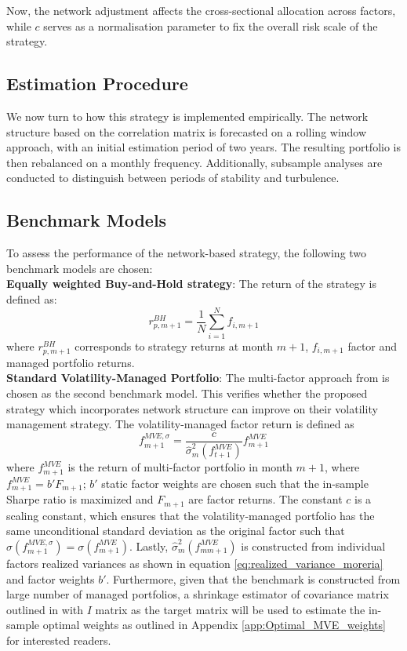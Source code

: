 \documentclass[11pt]{article}
\begin{document}
Now, the network adjustment affects the cross-sectional allocation across factors, while 
$c$ serves as a normalisation parameter to fix the overall risk scale of the strategy.

\subsection{Estimation Procedure}
We now turn to how this strategy is implemented empirically.
The network structure based on the correlation matrix is forecasted on a rolling window approach, with an initial estimation period of two years. The resulting portfolio is then rebalanced on a monthly frequency. Additionally, subsample analyses are conducted to distinguish between periods of stability and turbulence.

\subsection{Benchmark Models}
\label{sec:benchmark_models}
To assess the performance of the network-based strategy, the following two benchmark models are chosen: \\
\textbf{Equally weighted Buy-and-Hold strategy}:
The return of the strategy is defined as:
\begin{equation}
r^{BH}_{p,m+1} = \frac{1}{N} \sum_{i=1}^{N} f_{i,m+1}
\end{equation}
where $r_{p,m+1}^{BH}$ corresponds to strategy returns at month $m+1$, $f_{i,m+1}$ factor and managed portfolio returns. \\
\textbf{Standard Volatility-Managed Portfolio}:
The multi-factor approach from \cite{moreira2017volatility} is chosen as the second benchmark model. This verifies whether the proposed strategy which incorporates network structure can improve on their volatility management strategy.
The volatility-managed factor return is defined as 
\begin{equation}
\label{eq:moreira_MVE}
f^{MVE, \sigma}_{m+1} = \frac{c}{\hat\sigma^{2}_{m}\left( f_{t+1}^{MVE}\right)}f_{m+1}^{MVE}
\end{equation}
where $f_{m+1}^{MVE}$ is the return of multi-factor portfolio in month $m+1$, where $f_{m+1}^{MVE} = b'F_{m+1}$; $b'$ static factor weights are chosen such that the in-sample Sharpe ratio is maximized and $F_{m+1}$ are factor returns. The constant $c$ is a scaling constant, which ensures that the volatility-managed portfolio has the same unconditional standard deviation as the original factor  such that $ \sigma \left (f_{m+1}^{MVE, \sigma} \right) = \sigma \left ( f_{m+1}^{MVE}\right )$. Lastly, $\hat\sigma^{2}_{m}\left( f_{mm+1}^{MVE}\right)$ is constructed from individual factors realized variances as shown in equation \ref{eq:realized_variance_moreria} and factor weights $b'$. Furthermore, given that the benchmark is constructed from large number of managed portfolios, a shrinkage estimator of covariance matrix outlined in \cite{ledoit2004well} with $I$ matrix as the target matrix will be used to estimate the in-sample optimal weights as outlined in Appendix \ref{app:Optimal_MVE_weights} for interested readers.
\end{document}
